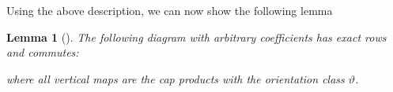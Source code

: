 \documentclass[reqno]{amsart}
\newtheorem{lemma}[theorem]{Lemma}
\theoremstyle{definition}
\theoremstyle{remark}
\begin{document}
      Using the above description, we can now show the following lemma

      \begin{lemma}[]
          The following diagram with arbitrary coefficients
          has exact rows and commutes:

          where all vertical maps are the cap products with the
          orientation class $\vartheta$.
      \end{lemma}
\end{document}
